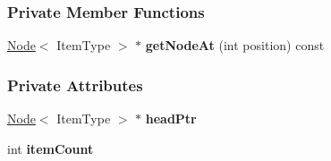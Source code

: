\subsubsection*{Private Member Functions}
\begin{DoxyCompactItemize}
\item 
\hypertarget{class_linked_list_aa6c640ac15f70a1e08ba92dc060e4a0e}{\hyperlink{class_node}{Node}$<$ Item\-Type $>$ $\ast$ {\bfseries get\-Node\-At} (int position) const }\label{class_linked_list_aa6c640ac15f70a1e08ba92dc060e4a0e}

\end{DoxyCompactItemize}
\subsubsection*{Private Attributes}
\begin{DoxyCompactItemize}
\item 
\hypertarget{class_linked_list_ae59caadbc6814867c20aa78f1bc9a566}{\hyperlink{class_node}{Node}$<$ Item\-Type $>$ $\ast$ {\bfseries head\-Ptr}}\label{class_linked_list_ae59caadbc6814867c20aa78f1bc9a566}

\item 
\hypertarget{class_linked_list_a964b92cf1253774e9e35f331d5fb3490}{int {\bfseries item\-Count}}\label{class_linked_list_a964b92cf1253774e9e35f331d5fb3490}

\end{DoxyCompactItemize}


